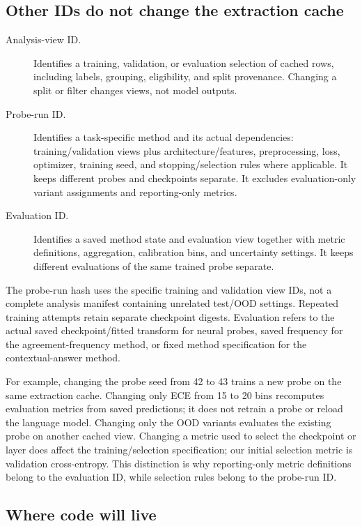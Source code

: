 \documentclass[11pt]{article}
\begin{document}
\subsection*{Other IDs do not change the extraction cache}

\begin{description}
\item[Analysis-view ID.] Identifies a training, validation, or evaluation selection of cached rows, including labels, grouping, eligibility, and split provenance.
Changing a split or filter changes views, not model outputs.
\item[Probe-run ID.] Identifies a task-specific method and its actual dependencies: training/validation views plus architecture/features, preprocessing, loss, optimizer, training seed, and stopping/selection rules where applicable.
It keeps different probes and checkpoints separate.
It excludes evaluation-only variant assignments and reporting-only metrics.
\item[Evaluation ID.] Identifies a saved method state and evaluation view together with metric definitions, aggregation, calibration bins, and uncertainty settings.
It keeps different evaluations of the same trained probe separate.
\end{description}
The probe-run hash uses the specific training and validation view IDs, not a complete analysis manifest containing unrelated test/OOD settings.
Repeated training attempts retain separate checkpoint digests.
Evaluation refers to the actual saved checkpoint/fitted transform for neural probes, saved frequency for the agreement-frequency method, or fixed method specification for the contextual-answer method.

For example, changing the probe seed from 42 to 43 trains a new probe on the same extraction cache.
Changing only ECE from 15 to 20 bins recomputes evaluation metrics from saved predictions; it does not retrain a probe or reload the language model.
Changing only the OOD variants evaluates the existing probe on another cached view.
Changing a metric used to select the checkpoint or layer does affect the training/selection specification; our initial selection metric is validation cross-entropy.
This distinction is why reporting-only metric definitions belong to the evaluation ID, while selection rules belong to the probe-run ID.

\subsection*{Where code will live}
\end{document}
